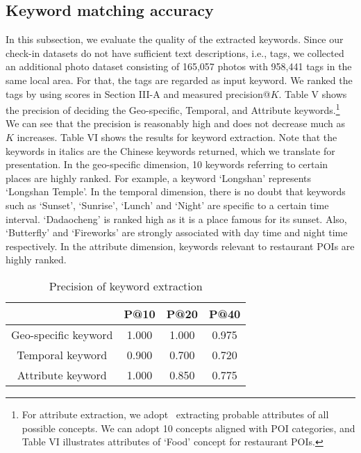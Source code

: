 \subsection{Keyword matching accuracy} \label{sec:exp.keyword}

In this subsection, we evaluate the quality of the extracted keywords. Since our check-in datasets do not have sufficient text descriptions, i.e., tags, we collected an additional photo dataset consisting of 165,057 photos with 958,441 tags in the same local area. For that, the tags are regarded as input keyword. We ranked the tags by using scores in Section III-A and measured precision@$K$. Table V shows the precision of deciding  the Geo-specific, Temporal, and Attribute keywords.\footnote{For attribute extraction, we adopt~\cite{lee2013attribute} extracting probable attributes of all possible concepts. We can adopt 10 concepts aligned with POI categories, and Table VI illustrates attributes of `Food' concept for restaurant POIs.} We can see that the precision is reasonably high and does not decrease much as $K$ increases. Table VI shows the results for keyword extraction. Note that the keywords in italics are the Chinese keywords returned, which we translate for presentation. In the geo-specific dimension, 10 keywords referring to certain places are highly ranked. For example, a keyword `Longshan' represents `Longshan Temple'. In the temporal dimension, there is no doubt that keywords such as `Sunset', `Sunrise', `Lunch' and `Night' are specific to a certain time interval. `Dadaocheng' is ranked high as it is a place famous for its sunset. Also, `Butterfly' and `Fireworks' are strongly associated with day time and night time respectively. In the attribute dimension, keywords relevant to restaurant POIs are highly ranked.

\begin{table}[h]\scriptsize
\begin{center}
\caption{Precision of keyword extraction}
\vspace{1mm}
{\scriptsize\begin{tabular}{ | c | c | c | c |}
    \hline
     & P@10 & P@20 & P@40 \\ \hline\hline
    Geo-specific keyword &  1.000&  1.000& 0.975 \\ \hline
    Temporal keyword &  0.900&  0.700& 0.720 \\ \hline
    Attribute keyword & 1.000&  0.850& 0.775 \\ \hline
 \end{tabular}}
\end{center}
\label{tab:keywordex1}
\end{table} 
\vspace{-2mm}

